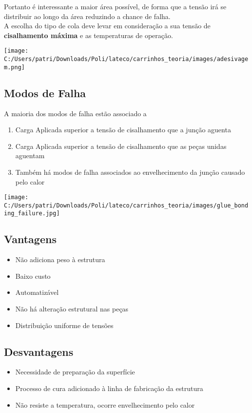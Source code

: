 Portanto é interessante a maior área possível, de forma que a tensão irá se distribuir ao longo da área reduzindo a chance de falha.\\
A escolha do tipo de cola deve levar em consideração a sua tensão de \textbf{cisalhamento máxima} e as temperaturas de operação.

\begin{center}
\texttt{[image: C:/Users/patri/Downloads/Poli/lateco/carrinhos\_teoria/images/adesivagem.png]}
\end{center}

\subsection{Modos de Falha}

A maioria dos modos de falha estão associado a 

\begin{enumerate}
	\item Carga Aplicada superior a tensão de cisalhamento que a junção aguenta
	\item Carga Aplicada superior a tensão de cisalhamento que as peças unidas aguentam
	\item Também há modos de falha associados ao envelhecimento da junção causado pelo calor
\end{enumerate}

\begin{center}
\texttt{[image: C:/Users/patri/Downloads/Poli/lateco/carrinhos\_teoria/images/glue\_bonding\_failure.jpg]}
\end{center}

\subsection{Vantagens}

\begin{itemize}
	\item Não adiciona peso à estrutura
	\item Baixo custo
	\item Automatizável
	\item Não há alteração estrutural nas peças
	\item Distribuição uniforme de tensões
\end{itemize}

\subsection{Desvantagens}

\begin{itemize}
	\item Necessidade de preparação da superfície
	\item Processo de cura adicionado à linha de fabricação da estrutura
	\item Não resiste a temperatura, ocorre envelhecimento pelo calor
\end{itemize}